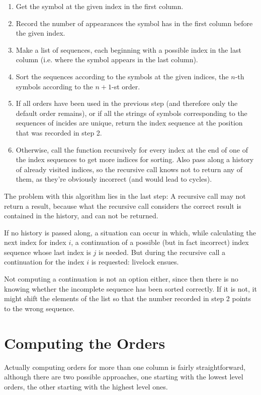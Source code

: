 \documentclass[a4paper]{scrreprt}
\begin{document}
\begin{enumerate}
  \item Get the symbol at the given index in the first column.
  \item Record the number of appearances the symbol has in the first column
  before the given index.
  \item Make a list of sequences, each beginning with a possible index in the
  last column (i.e. where the symbol appears in the last column).
  \item Sort the sequences according to the symbols at the given indices, the
  \(n\)-th symbols according to the \(n + 1\)-st order.
  \item If all orders have been used in the previous step (and therefore only
  the default order remains), or if all the strings of symbols corresponding to
  the sequences of incides are unique, return the index sequence at the position
  that was recorded in step 2.
  \item Otherwise, call the function recursively for every index at the end of
  one of the index sequences to get more indices for sorting. Also pass along a
  history of already visited indices, so the recursive call knows not to return
  any of them, as they're obviously incorrect (and would lead to cycles).
\end{enumerate}

The problem with this algorithm lies in the last step: A recursive call may not
return a result, because what the recursive call considers the correct result is
contained in the history, and can not be returned.

If no history is passed along, a situation can occur in which, while calculating
the next index for index \(i\), a continuation of a possible (but in fact
incorrect) index sequence whose last index is \(j\) is needed. But during the
recursive call a continuation for the index \(i\) is requested: livelock ensues.

Not computing a continuation is not an option either, since then there is no
knowing whether the incomplete sequence has been sorted correctly. If it is not,
it might shift the elements of the list so that the number recorded in step 2
points to the wrong sequence.

\section{Computing the Orders}

Actually computing orders for more than one column is fairly straightforward,
although there are two possible approaches, one starting with the lowest level
orders, the other starting with the highest level ones.
\end{document}
